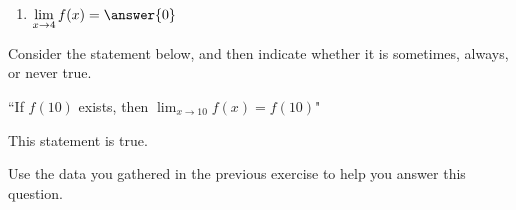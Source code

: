 \documentclass[handout]{ximera}
\begin{document}
\begin{exercise}
\begin{enumerate}

\item $\displaystyle\lim_{x\to 4} f(x) = \answer{0}$ 

\end{enumerate}

\end{exercise}

\begin{exercise}

Consider the statement below, and then indicate whether it is sometimes, always, or never true.

\begin{center} ``If $f(10)$ exists, then $\displaystyle\lim_{x\to 10} f(x) = f(10)$" \end{center}

This statement is  true.

\begin{hint}

Use the data you gathered in the previous exercise to help you answer this question.  

\end{hint}

\end{exercise}
\end{document}
